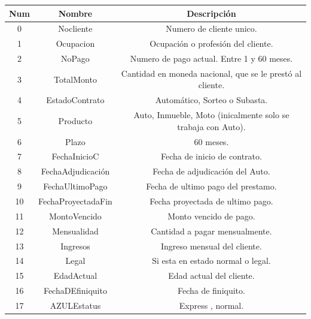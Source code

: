 \begin{table}[H]
    \centering
    \begin{tabular}{|c|c|c|}
        \hline
        \rowcolor{softblue} %
        \textbf{Num} & \textbf{Nombre} & \textbf{Descripción} \\
        \hline
        \hline
        0 &	Nocliente &		Numero de cliente unico.   \\
        \hline
        1 &	Ocupacion &		Ocupación o profesión del cliente. 	\\
        \hline
        2 &  NoPago    &     Numero de pago actual. Entre 1 y 60 meses.  \\
        \hline
        3 &  TotalMonto  &    Cantidad  en moneda nacional, que se le prestó al cliente. \\
        \hline
        4 &  EstadoContrato &     Automático, Sorteo o Subasta.  \\
        \hline
        5 &   Producto  &         Auto, Inmueble, Moto (inicalmente solo se trabaja con Auto).  \\
        \hline
        6 &  Plazo     &          60 meses.  \\
        \hline
        7 &  FechaInicioC  &      Fecha de inicio de contrato.  \\
        \hline
        8 &  FechaAdjudicación &   Fecha de adjudicación del Auto.  \\
        \hline
        9 &   FechaUltimoPago &    Fecha de ultimo pago del prestamo. \\
        \hline
        10 &  FechaProyectadaFin &  Fecha proyectada de ultimo pago. \\
        \hline
        11 &  MontoVencido &        Monto vencido de pago.  \\
        \hline
        12 &  Mensualidad &         Cantidad a pagar mensualmente.  \\
        \hline
        13 &  Ingresos &    Ingreso mensual del cliente.  \\
        \hline
        14 &  Legal &     Si esta en estado normal o legal. \\
        \hline
        15 &  EdadActual &   Edad actual del cliente. \\
        \hline
        16 &  FechaDEfiniquito &    Fecha de finiquito. \\
        \hline
        17 &  AZULEstatus &   Express , normal. \\

\end{tabular}
\end{table}
